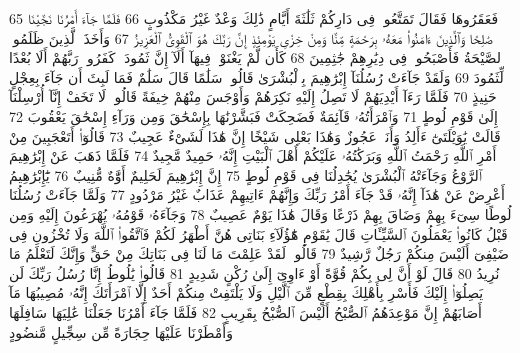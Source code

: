 {\tiny\colorbox{cl_aya}{65}} فَعَقَرُوهَا فَقَالَ تَمَتَّعُوا۟ فِى دَارِكُمْ ثَلَٰثَةَ أَيَّامٍ ذَٰلِكَ وَعْدٌ غَيْرُ مَكْذُوبٍ
{\tiny\colorbox{cl_aya}{66}} فَلَمَّا جَآءَ أَمْرُنَا نَجَّيْنَا صَٰلِحًا وَٱلَّذِينَ ءَامَنُوا۟ مَعَهُۥ بِرَحْمَةٍ مِّنَّا وَمِنْ خِزْىِ يَوْمِئِذٍ إِنَّ رَبَّكَ هُوَ ٱلْقَوِىُّ ٱلْعَزِيزُ
{\tiny\colorbox{cl_aya}{67}} وَأَخَذَ ٱلَّذِينَ ظَلَمُوا۟ ٱلصَّيْحَةُ فَأَصْبَحُوا۟ فِى دِيَٰرِهِمْ جَٰثِمِينَ
{\tiny\colorbox{cl_aya}{68}} كَأَن لَّمْ يَغْنَوْا۟ فِيهَآ أَلَآ إِنَّ ثَمُودَا۟ كَفَرُوا۟ رَبَّهُمْ أَلَا بُعْدًا لِّثَمُودَ
{\tiny\colorbox{cl_aya}{69}} وَلَقَدْ جَآءَتْ رُسُلُنَآ إِبْرَٰهِيمَ بِٱلْبُشْرَىٰ قَالُوا۟ سَلَٰمًا قَالَ سَلَٰمٌ فَمَا لَبِثَ أَن جَآءَ بِعِجْلٍ حَنِيذٍ
{\tiny\colorbox{cl_aya}{70}} فَلَمَّا رَءَآ أَيْدِيَهُمْ لَا تَصِلُ إِلَيْهِ نَكِرَهُمْ وَأَوْجَسَ مِنْهُمْ خِيفَةً قَالُوا۟ لَا تَخَفْ إِنَّآ أُرْسِلْنَآ إِلَىٰ قَوْمِ لُوطٍ
{\tiny\colorbox{cl_aya}{71}} وَٱمْرَأَتُهُۥ قَآئِمَةٌ فَضَحِكَتْ فَبَشَّرْنَٰهَا بِإِسْحَٰقَ وَمِن وَرَآءِ إِسْحَٰقَ يَعْقُوبَ
{\tiny\colorbox{cl_aya}{72}} قَالَتْ يَٰوَيْلَتَىٰٓ ءَأَلِدُ وَأَنَا۠ عَجُوزٌ وَهَٰذَا بَعْلِى شَيْخًا إِنَّ هَٰذَا لَشَىْءٌ عَجِيبٌ
{\tiny\colorbox{cl_aya}{73}} قَالُوٓا۟ أَتَعْجَبِينَ مِنْ أَمْرِ ٱللَّهِ رَحْمَتُ ٱللَّهِ وَبَرَكَٰتُهُۥ عَلَيْكُمْ أَهْلَ ٱلْبَيْتِ إِنَّهُۥ حَمِيدٌ مَّجِيدٌ
{\tiny\colorbox{cl_aya}{74}} فَلَمَّا ذَهَبَ عَنْ إِبْرَٰهِيمَ ٱلرَّوْعُ وَجَآءَتْهُ ٱلْبُشْرَىٰ يُجَٰدِلُنَا فِى قَوْمِ لُوطٍ
{\tiny\colorbox{cl_aya}{75}} إِنَّ إِبْرَٰهِيمَ لَحَلِيمٌ أَوَّٰهٌ مُّنِيبٌ
{\tiny\colorbox{cl_aya}{76}} يَٰٓإِبْرَٰهِيمُ أَعْرِضْ عَنْ هَٰذَآ إِنَّهُۥ قَدْ جَآءَ أَمْرُ رَبِّكَ وَإِنَّهُمْ ءَاتِيهِمْ عَذَابٌ غَيْرُ مَرْدُودٍ
{\tiny\colorbox{cl_aya}{77}} وَلَمَّا جَآءَتْ رُسُلُنَا لُوطًا سِىٓءَ بِهِمْ وَضَاقَ بِهِمْ ذَرْعًا وَقَالَ هَٰذَا يَوْمٌ عَصِيبٌ
{\tiny\colorbox{cl_aya}{78}} وَجَآءَهُۥ قَوْمُهُۥ يُهْرَعُونَ إِلَيْهِ وَمِن قَبْلُ كَانُوا۟ يَعْمَلُونَ ٱلسَّيِّـَٔاتِ قَالَ يَٰقَوْمِ هَٰٓؤُلَآءِ بَنَاتِى هُنَّ أَطْهَرُ لَكُمْ فَٱتَّقُوا۟ ٱللَّهَ وَلَا تُخْزُونِ فِى ضَيْفِىٓ أَلَيْسَ مِنكُمْ رَجُلٌ رَّشِيدٌ
{\tiny\colorbox{cl_aya}{79}} قَالُوا۟ لَقَدْ عَلِمْتَ مَا لَنَا فِى بَنَاتِكَ مِنْ حَقٍّ وَإِنَّكَ لَتَعْلَمُ مَا نُرِيدُ
{\tiny\colorbox{cl_aya}{80}} قَالَ لَوْ أَنَّ لِى بِكُمْ قُوَّةً أَوْ ءَاوِىٓ إِلَىٰ رُكْنٍ شَدِيدٍ
{\tiny\colorbox{cl_aya}{81}} قَالُوا۟ يَٰلُوطُ إِنَّا رُسُلُ رَبِّكَ لَن يَصِلُوٓا۟ إِلَيْكَ فَأَسْرِ بِأَهْلِكَ بِقِطْعٍ مِّنَ ٱلَّيْلِ وَلَا يَلْتَفِتْ مِنكُمْ أَحَدٌ إِلَّا ٱمْرَأَتَكَ إِنَّهُۥ مُصِيبُهَا مَآ أَصَابَهُمْ إِنَّ مَوْعِدَهُمُ ٱلصُّبْحُ أَلَيْسَ ٱلصُّبْحُ بِقَرِيبٍ
{\tiny\colorbox{cl_aya}{82}} فَلَمَّا جَآءَ أَمْرُنَا جَعَلْنَا عَٰلِيَهَا سَافِلَهَا وَأَمْطَرْنَا عَلَيْهَا حِجَارَةً مِّن سِجِّيلٍ مَّنضُودٍ
